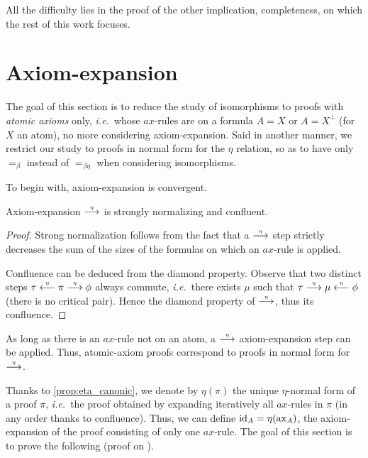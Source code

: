 \documentclass{lmcs}
\newcommand*{\orth}{^\perp} %
\newcommand*{\ie}{\emph{i.e.}}
\newcommand*{\eqeq}{=} %
\newcommand{\symboltext}[2]{\mathrel{\overset{\makebox[0pt]{\mbox{\normalfont\tiny\sffamily \ensuremath{#1}}}}{#2}}} %
\newcommand{\etato}{\symboltext{\eta}{\longrightarrow}}
\newcommand{\etafrom}{\symboltext{\eta}{\longleftarrow}}
\newcommand{\eqb}{\mathrel{\eqeq_{\beta}}}
\newcommand{\eqbn}{\mathrel{\eqeq_{\beta\eta}}}
\newcommand*{\id}[1]{\ensuremath{\textnormal{id}_{#1}}}
\newcommand*{\ax}[1]{\ensuremath{\textnormal{ax}_{#1}}}
\begin{document}
All the difficulty lies in the proof of the other implication, completeness, on which the rest of this work focuses.


\section{Axiom-expansion}
\label{subsec:no_eta}

The goal of this section is to reduce the study of isomorphisms to proofs with \emph{atomic axioms} only, \ie\ whose $ax$-rules are on a formula $A=X$ or $A=X\orth$ (for $X$ an atom), no more considering axiom-expansion.
Said in another manner, we restrict our study to proofs in normal form for the $\eta$ relation, so as to have only $\eqb$ instead of $\eqbn$ when considering isomorphisms.

To begin with, axiom-expansion is convergent.

\begin{prop}
\label{prop:eta_canonic}
Axiom-expansion $\etato$ is strongly normalizing and confluent.
\end{prop}
\begin{proof}
Strong normalization follows from the fact that a $\etato$ step strictly decreases the sum of the sizes of the formulas on which an $ax$-rule is applied.

Confluence can be deduced from the diamond property.
Observe that two distinct steps $\tau\etafrom\pi\etato\phi$ always commute, \ie\ there exists $\mu$ such that $\tau\etato\mu\etafrom\phi$ (there is no critical pair).
Hence the diamond property of $\etato$, thus its confluence.
\end{proof}

\begin{rem}
\label{rem:eta_ax-exp}
As long as there is an $ax$-rule not on an atom, a $\etato$ axiom-expansion step can be applied.
Thus, atomic-axiom proofs correspond to proofs in normal form for $\etato$.
\end{rem}

Thanks to \autoref{prop:eta_canonic}, we denote by $\eta(\pi)$ the unique $\eta$-normal form of a proof $\pi$, \ie\ the proof obtained by expanding iteratively all $ax$-rules in $\pi$ (in any order thanks to confluence).
Thus, we can define $\id{A} = \eta(\ax{A})$, the axiom-expansion of the proof consisting of only one $ax$-rule.
The goal of this section is to prove the following (proof on ).
\end{document}
